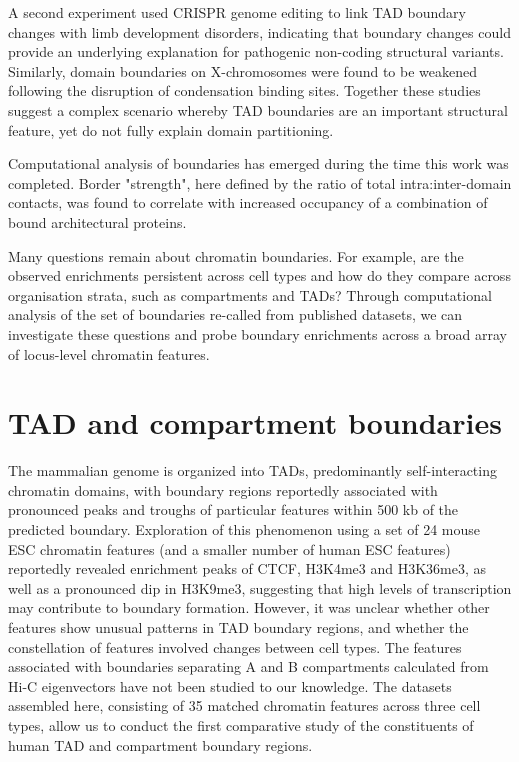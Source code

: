 \documentclass[a4paper,10pt,oneside]{book}
\begin{document}
A second experiment used CRISPR genome editing to link TAD boundary changes with limb development disorders,\cite{Lupianez2015} indicating that boundary changes could provide an underlying explanation for pathogenic non-coding structural variants.\cite{Ren2015} Similarly, domain boundaries on X-chromosomes were found to be weakened following the disruption of condensation binding sites.\cite{Crane2015} Together these studies suggest a complex scenario whereby TAD boundaries are an important structural feature, yet do not fully explain domain partitioning.

Computational analysis of boundaries has emerged during the time this work was completed. Border "strength", here defined by the ratio of total intra:inter-domain contacts, was found to correlate with increased occupancy of a combination of bound architectural proteins.\cite{VanBortle2014}

Many questions remain about chromatin boundaries. For example, are the observed enrichments persistent across cell types and how do they compare across organisation strata, such as compartments and TADs? Through computational analysis of the set of boundaries re-called from published datasets, we can investigate these questions and probe boundary enrichments across a broad array of locus-level chromatin features.

\section{TAD and compartment boundaries}\label{sec:boundaryenrichments}

The mammalian genome is organized into TADs, predominantly self-interacting chromatin domains, with boundary regions reportedly associated with pronounced peaks and troughs of particular features within 500 kb of the predicted boundary.\cite{Dixon2012} Exploration of this phenomenon using a set of 24 mouse ESC chromatin features (and a smaller number of human ESC features) reportedly revealed enrichment peaks of CTCF, H3K4me3 and H3K36me3, as well as a pronounced dip in H3K9me3, suggesting that high levels of transcription may contribute to boundary formation.\cite{Dixon2012} However, it was unclear whether other features show unusual patterns in TAD boundary regions, and whether the constellation of features involved changes between cell types. The features associated with boundaries separating A and B compartments calculated from Hi-C eigenvectors have not been studied to our knowledge. The datasets assembled here, consisting of 35 matched chromatin features across three cell types, allow us to conduct the first comparative study of the constituents of human TAD and compartment boundary regions.
\end{document}
